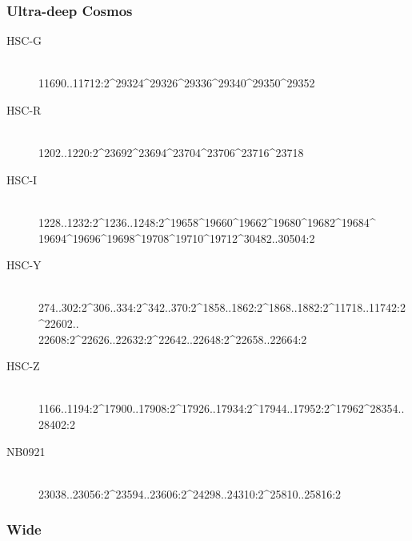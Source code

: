\documentclass[DM,obsolete,STS,toc]{lsstdoc}
\begin{document}
\subsubsection{Ultra-deep Cosmos}
\label{sec:hscrc1}

\begin{description}

\item[HSC-G]{\hfill \\ 11690..11712:2\^{}29324\^{}29326\^{}29336\^{}29340\^{}29350\^{}29352}
\item[HSC-R]{\hfill \\ 1202..1220:2\^{}23692\^{}23694\^{}23704\^{}23706\^{}23716\^{}23718}
\item[HSC-I]{\hfill \\ 1228..1232:2\^{}1236..1248:2\^{}19658\^{}19660\^{}19662\^{}19680\^{}19682\^{}19684\^{}\\19694\^{}19696\^{}19698\^{}19708\^{}19710\^{}19712\^{}30482..30504:2}
\item[HSC-Y]{\hfill \\ 274..302:2\^{}306..334:2\^{}342..370:2\^{}1858..1862:2\^{}1868..1882:2\^{}11718..11742:2\^{}22602..\\22608:2\^{}22626..22632:2\^{}22642..22648:2\^{}22658..22664:2}
\item[HSC-Z]{\hfill \\ 1166..1194:2\^{}17900..17908:2\^{}17926..17934:2\^{}17944..17952:2\^{}17962\^{}28354..28402:2}
\item[NB0921]{\hfill \\ 23038..23056:2\^{}23594..23606:2\^{}24298..24310:2\^{}25810..25816:2}

\end{description}

\subsubsection{Wide}
\end{document}
